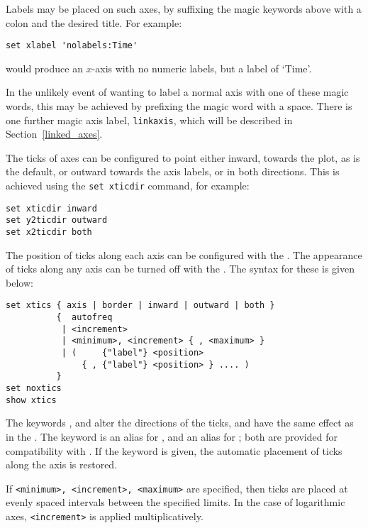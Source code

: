 Labels may be placed on such axes, by suffixing the magic keywords above with a
colon and the desired title. For example:

\begin{verbatim}
set xlabel 'nolabels:Time'
\end{verbatim}

\noindent would produce an $x$-axis with no numeric labels, but a label of
`Time'.

In the unlikely event of wanting
to label a normal axis with one of these magic words, this may be achieved by prefixing the magic
word with a space. There is one further magic axis label, {\tt linkaxis},
which will be described in Section~\ref{linked_axes}.

The ticks of axes can be configured to point either inward, towards the plot,
as is the default, or outward towards the axis labels, or in both directions.
This is achieved using the {\tt set xticdir} command, for example:

\begin{verbatim}
set xticdir inward
set y2ticdir outward
set x2ticdir both
\end{verbatim}

The position of ticks along each axis can be configured with the . The appearance of ticks along any axis can be turned off with the
. The syntax for these is given below:

\begin{verbatim}
set xtics { axis | border | inward | outward | both }
          {  autofreq
           | <increment>
           | <minimum>, <increment> { , <maximum> }
           | (     {"label"} <position>
               { , {"label"} <position> } .... )
          }
set noxtics
show xtics
\end{verbatim}

The keywords ,  and  alter the
directions of the ticks, and have the same effect as in the . The keyword  is an alias for , and
 an alias for ; both are provided for
compatibility with \gnuplot. If the keyword  is given, the
automatic placement of ticks along the axis is restored.

If {\tt <minimum>, <increment>, <maximum>} are specified, then ticks are
placed at evenly spaced intervals between the specified limits. In the case of
logarithmic axes, {\tt <increment>} is applied multiplicatively.

